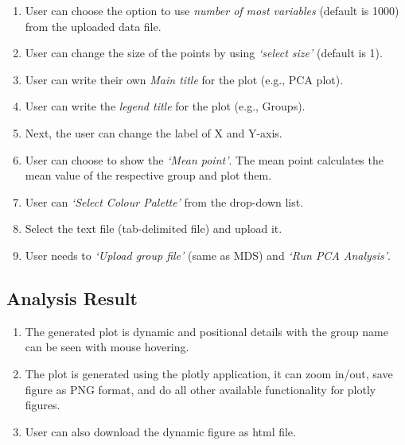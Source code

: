 \documentclass[
  a4paper,
  oneside,
  open=any]{scrreport}
\providecommand{\tightlist}{%
  \setlength{\itemsep}{0pt}\setlength{\parskip}{0pt}}\usepackage{longtable,booktabs,array}
\begin{document}
\begin{enumerate}
\def\labelenumi{\arabic{enumi}.}
\tightlist
\item
  User can choose the option to use \emph{number of most variables}
  (default is 1000) from the uploaded data file.
\item
  User can change the size of the points by using \emph{`select size'}
  (default is 1).
\item
  User can write their own \emph{Main title} for the plot (e.g., PCA
  plot).
\item
  User can write the \emph{legend title} for the plot (e.g., Groups).
\item
  Next, the user can change the label of X and Y-axis.
\item
  User can choose to show the \emph{`Mean point'}. The mean point
  calculates the mean value of the respective group and plot them.
\item
  User can \emph{`Select Colour Palette'} from the drop-down list.
\item
  Select the text file (tab-delimited file) and upload it.
\item
  User needs to \emph{`Upload group file'} (same as MDS) and \emph{`Run
  PCA Analysis'}.
\end{enumerate}

\hypertarget{analysis-result-1}{%
\subsection{Analysis Result}\label{analysis-result-1}}

\begin{enumerate}
\def\labelenumi{\arabic{enumi}.}
\tightlist
\item
  The generated plot is dynamic and positional details with the group
  name can be seen with mouse hovering.
\item
  The plot is generated using the plotly application, it can zoom
  in/out, save figure as PNG format, and do all other available
  functionality for plotly figures.
\item
  User can also download the dynamic figure as html file.
\end{enumerate}
\end{document}
